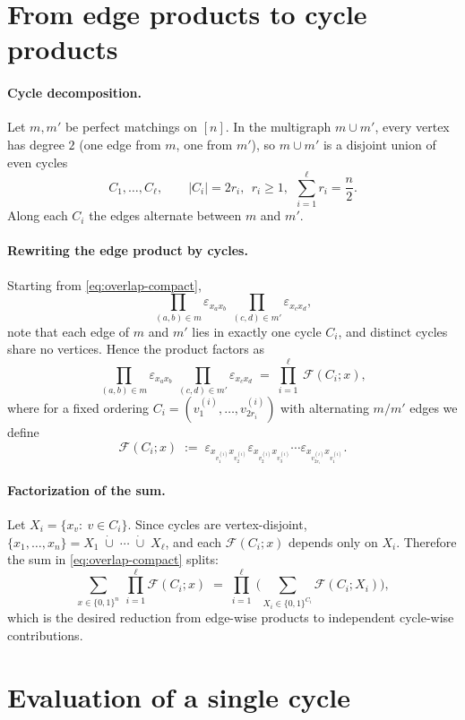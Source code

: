 \documentclass[11pt]{article}
\begin{document}
\section*{From edge products to cycle products}

\paragraph{Cycle decomposition.}
Let $m,m'$ be perfect matchings on $[n]$.
In the multigraph $m\cup m'$, every vertex has degree $2$ (one edge from $m$, one from $m'$),
so $m\cup m'$ is a disjoint union of even cycles
\[
C_1,\dots,C_\ell,\qquad |C_i|=2r_i,\ \ r_i\ge 1,\ \ \sum_{i=1}^{\ell} r_i=\frac{n}{2}.
\]
Along each $C_i$ the edges alternate between $m$ and $m'$.

\paragraph{Rewriting the edge product by cycles.}
Starting from \eqref{eq:overlap-compact},
\[
\prod_{(a,b)\in m}\varepsilon_{x_a x_b}\;\prod_{(c,d)\in m'}\varepsilon_{x_c x_d},
\]
note that each edge of $m$ and $m'$ lies in exactly one cycle $C_i$, and distinct cycles share no vertices.
Hence the product factors as
\[
\prod_{(a,b)\in m}\varepsilon_{x_a x_b}\;\prod_{(c,d)\in m'}\varepsilon_{x_c x_d}
\;=\;
\prod_{i=1}^{\ell}\ \mathcal{F}(C_i;x),
\]
where for a fixed ordering $C_i=(v^{(i)}_1,\dots,v^{(i)}_{2r_i})$ with alternating $m/m'$ edges we define
\[
\mathcal{F}(C_i;x)
\;:=\;
\varepsilon_{x_{v^{(i)}_1}x_{v^{(i)}_2}}
\varepsilon_{x_{v^{(i)}_2}x_{v^{(i)}_3}}
\cdots
\varepsilon_{x_{v^{(i)}_{2r_i}}x_{v^{(i)}_1}}.
\]

\paragraph{Factorization of the sum.}
Let $X_i=\{x_v:\ v\in C_i\}$.
Since cycles are vertex-disjoint, $\{x_1,\dots,x_n\}=X_1\;\dot\cup\;\cdots\;\dot\cup\;X_\ell$, and each
$\mathcal{F}(C_i;x)$ depends only on $X_i$.
Therefore the sum in \eqref{eq:overlap-compact} splits:
\[
\sum_{x\in\{0,1\}^n}\ \prod_{i=1}^{\ell}\mathcal{F}(C_i;x)
\;=\;
\prod_{i=1}^{\ell}\ \Biggl(\sum_{X_i\in\{0,1\}^{C_i}} \mathcal{F}(C_i;X_i)\Biggr),
\]
which is the desired reduction from edge-wise products to independent cycle-wise contributions.

\section*{Evaluation of a single cycle}
\end{document}
